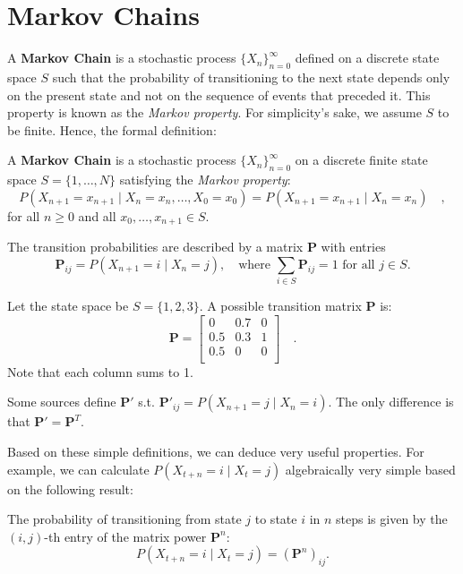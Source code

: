 \documentclass[../../main.tex]{subfiles}
\begin{document}
\section{Markov Chains}
\label{section:markov_chains}

A \textbf{Markov Chain} is a stochastic process $\{X_n\}_{n=0}^\infty$ defined on a discrete state space $S$ such that the probability of transitioning to the next state depends only on the present state and not on the sequence of events that preceded it. This property is known as the \emph{Markov property}. For simplicity's sake, we assume $S$ to be finite. Hence, the formal definition:

\begin{definition}
A \textbf{Markov Chain} is a stochastic process $\{X_n\}_{n=0}^\infty$ on a discrete finite state space $S = \{1, \dots , N\}$ satisfying the \emph{Markov property}:
\[
    P(X_{n+1} = x_{n+1} \mid X_n = x_n, \dots, X_0 = x_0) = P(X_{n+1} = x_{n+1} \mid X_n = x_n) \quad ,
\]
for all $n \geq 0$ and all $x_0, \dots, x_{n+1} \in S$.

\noindent
The transition probabilities are described by a matrix $\bm{P}$ with entries
\[
    \bm{P}_{ij} = P(X_{n+1} = i \mid X_n = j), \quad \text{where } \sum_{i \in S} \bm{P}_{ij} = 1 \text{ for all } j \in S.
\]
\end{definition}


\begin{example}
\label{ex:markov_chain}
Let the state space be $S = \{1, 2, 3\}$. A possible transition matrix $\bm{P}$ is:
\[
\bm{P} =
\begin{bmatrix}
0 & 0.7 & 0 \\
0.5 & 0.3 & 1 \\
0.5 & 0 & 0 \\
\end{bmatrix}
\quad .
\]
Note that each column sums to 1.
\end{example}


\begin{remark}
    Some sources define $\bm{P'}$ s.t. $\bm{P'}_{ij} = P(X_{n+1} = j \mid X_n = i)$. The only difference is that $\bm{P'} = \bm{P}^T$.
\end{remark}


Based on these simple definitions, we can deduce very useful properties. For example, we can calculate $P(X_{t+n} = i \mid X_t = j)$ algebraically very simple based on the following result:


\begin{lemma}
The probability of transitioning from state $j$ to state $i$ in $n$ steps is given by the $(i,j)$-th entry of the matrix power $\bm{P}^n$:
\[
    P(X_{t+n} = i \mid X_t = j) = (\bm{P}^n)_{ij}.
\]
\end{lemma}
\end{document}
